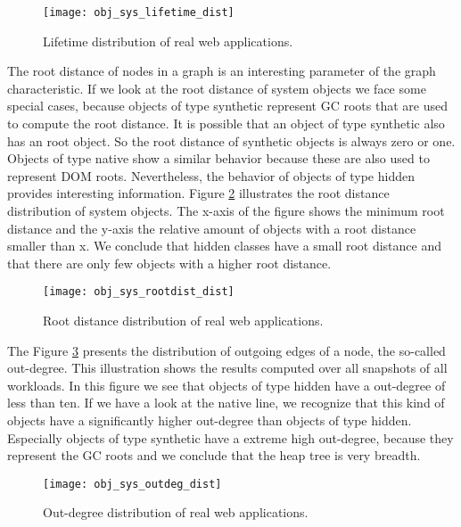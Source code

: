 \begin{figure}
	\centering
	\texttt{[image: obj\_sys\_lifetime\_dist]}
	\caption{Lifetime distribution of real web applications.}
	\label{fig:obj_sys_lieftiem_dist}
\end{figure}

The root distance of nodes in a graph is an interesting parameter of the graph characteristic. If we look at the root distance of system objects we face some special cases, because objects of type synthetic represent GC roots that are used to compute the root distance. It is possible that an object of type synthetic also has an root object. So the root distance of synthetic objects is always zero or one. Objects of type native show a similar behavior because these are also used to represent DOM roots. Nevertheless, the behavior of objects of type hidden provides interesting information. Figure \ref{fig:obj_sys_rootdist_dist} illustrates the root distance distribution of system objects. The x-axis of the figure shows the minimum root distance and the y-axis the relative amount of objects with a root distance smaller than x. We conclude that hidden classes have a small root distance and that there are only few objects with a higher root distance.

\begin{figure}
	\centering
	\texttt{[image: obj\_sys\_rootdist\_dist]}
	\caption{Root distance distribution of real web applications.}
	\label{fig:obj_sys_rootdist_dist}
\end{figure}

The Figure \ref{fig:obj_sys_outdeg_dist} presents the distribution of outgoing
edges of a node, the so-called out-degree. This illustration shows the results
computed over all snapshots of all workloads. In this figure we see that
objects of type hidden have a out-degree of less than ten. If we have a look at
the native line, we recognize that this kind of objects have a significantly
higher out-degree than objects of type hidden. Especially objects of type
synthetic have a extreme high out-degree, because they represent the GC roots
and we conclude that the heap tree is very breadth.

\begin{figure}
	\centering
	\texttt{[image: obj\_sys\_outdeg\_dist]}
	\caption{Out-degree distribution of real web applications.}
	\label{fig:obj_sys_outdeg_dist}
\end{figure}

% 
